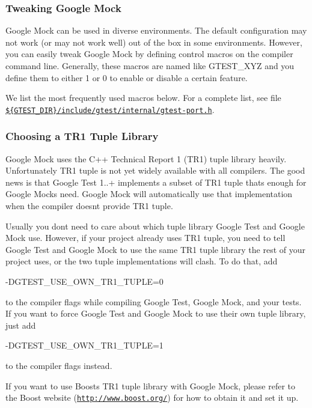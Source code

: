 \subsubsection*{Tweaking Google Mock}

Google Mock can be used in diverse environments. The default configuration may not work (or may not work well) out of the box in some environments. However, you can easily tweak Google Mock by defining control macros on the compiler command line. Generally, these macros are named like {\ttfamily G\+T\+E\+S\+T\+\_\+\+X\+YZ} and you define them to either 1 or 0 to enable or disable a certain feature.

We list the most frequently used macros below. For a complete list, see file \href{../googletest/include/gtest/internal/gtest-port.h}{\tt \$\{G\+T\+E\+S\+T\+\_\+\+D\+IR\}/include/gtest/internal/gtest-\/port.h}.

\subsubsection*{Choosing a T\+R1 Tuple Library}

Google Mock uses the C++ Technical Report 1 (T\+R1) tuple library heavily. Unfortunately T\+R1 tuple is not yet widely available with all compilers. The good news is that Google Test 1..+ implements a subset of T\+R1 tuple that\textquotesingle{}s enough for Google Mock\textquotesingle{}s need. Google Mock will automatically use that implementation when the compiler doesn\textquotesingle{}t provide T\+R1 tuple.

Usually you don\textquotesingle{}t need to care about which tuple library Google Test and Google Mock use. However, if your project already uses T\+R1 tuple, you need to tell Google Test and Google Mock to use the same T\+R1 tuple library the rest of your project uses, or the two tuple implementations will clash. To do that, add \begin{DoxyVerb}-DGTEST_USE_OWN_TR1_TUPLE=0
\end{DoxyVerb}


to the compiler flags while compiling Google Test, Google Mock, and your tests. If you want to force Google Test and Google Mock to use their own tuple library, just add \begin{DoxyVerb}-DGTEST_USE_OWN_TR1_TUPLE=1
\end{DoxyVerb}


to the compiler flags instead.

If you want to use Boost\textquotesingle{}s T\+R1 tuple library with Google Mock, please refer to the Boost website (\href{http://www.boost.org/}{\tt http\+://www.\+boost.\+org/}) for how to obtain it and set it up.

